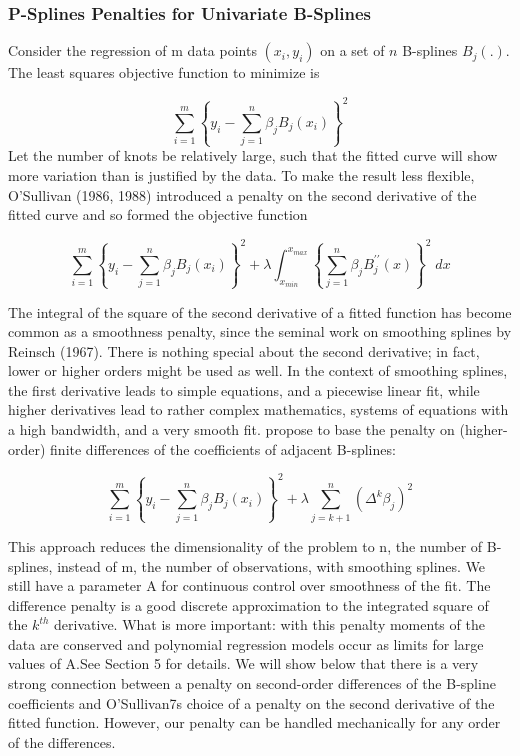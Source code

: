 \documentclass[12pt]{article}
\newcommand*\outlineskeleton{\color{green}}
\begin{document}
\subsubsection{{\outlineskeleton P-Splines Penalties for Univariate B-Splines}}

Consider the regression of m data points $\left(x_i,y_i\right)$ on a set of $n$ B-splines $B_j(.)$. The least squares objective function to minimize is

\begin{equation} \label{univariate_bspline_SSE}
\sum_{i=1}^m \left\{ y_i - \sum_{j=1}^n \beta_j B_j\left(x_i\right) \right\}^2
\end{equation}
\noindent
Let the number of knots be relatively large, such that the fitted curve will show more variation than is justified by the data. To make the result less flexible, O'Sullivan (1986, 1988) introduced a penalty on the second derivative of the fitted curve and so formed the objective function

\begin{equation} \label{univariate_bspline_ridge_penalty}
\sum_{i=1}^m \left \{ y_i - \sum_{j=1}^n \beta_j B_j\left(x_i\right) \right \}^2 + \lambda \int_{x_{min}}^{x_{max}} \left\{  \sum_{j=1}^n \beta_j B^{\prime \prime}_j\left(x\right) \right\}^2 \; dx
\end{equation}


The integral of the square of the second derivative of a fitted function has become common as a smoothness penalty, since the seminal work on smoothing splines by Reinsch (1967). There is nothing special about the second derivative; in fact, lower or higher orders might be used as well. In the context of smoothing splines, the first derivative leads to simple equations, and a piecewise linear fit, while higher derivatives lead to rather complex mathematics, systems of equations with a high bandwidth, and a very smooth fit. \cite{eilers1996flexible} propose to base the penalty on (higher-order) finite differences of the coefficients of adjacent B-splines:

\begin{equation} \label{univariate_pspline_diff_penalty}
\sum_{i=1}^m \left \{ y_i - \sum_{j=1}^n \beta_j B_j\left(x_i\right) \right \}^2 + \lambda \sum_{j=k+1}^n \left( \Delta^k \beta_j  \right)^2
\end{equation}

This approach reduces the dimensionality of the problem to n, the number of B-splines, instead of m, the number of observations, with smoothing splines. We still have a parameter A for continuous control over smoothness of the fit. The difference penalty is a good discrete approximation to the integrated square of the $k^{th}$ derivative. What is more important: with this penalty moments of the data are conserved and polynomial regression models occur as limits for large values of A.See Section 5 for details. We will show below that there is a very strong connection between a penalty on second-order differences of the B-spline coefficients and O'Sullivan7s choice of a penalty on the second derivative of the fitted function. However, our penalty can be handled mechanically for any order of the differences.
\end{document}
